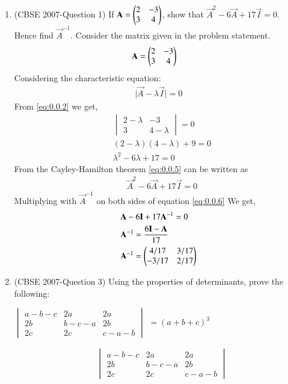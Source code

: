 \documentclass[journal,12pt,twocolumn]{IEEEtran}
\begin{document}
\begin{enumerate}

\item (CBSE 2007-Question 1)
If $\mathbf{A} = \begin{pmatrix}2&-3\\3&4\end{pmatrix}$, show that $ \vec{A}^2-6\vec{A}+17\vec{I}=0$. Hence find $\vec{A}^{-1}$. 
\solution Consider the matrix  given in the problem statement.
\begin{align}
&\mathbf{A} = \begin{pmatrix}2&-3\\3&4\end{pmatrix}&
\end{align}
Considering the characteristic equation:  
\begin{align} 
& \vert\vec{A}-\lambda\vec{I}\vert = 0  & \label{eq:0.0.2}
\end{align}
From \eqref{eq:0.0.2} we get,
\begin{align}
&\begin{vmatrix}
  2-\lambda & -3\\ 3& 4-\lambda 
\end{vmatrix}
=0 \\
&(2-\lambda)(4-\lambda)+9=0\\ 
&\lambda^2-6\lambda+17=0 \label{eq:0.0.5} 
\end{align}
From the Cayley-Hamilton theorem \eqref{eq:0.0.5} can be written as
\begin{align}
&\vec{A}^2-6\vec{A}+17\vec{I} = 0  \label{eq:0.0.6} 
\end{align} 
Multiplying with $\vec{A}^{-1}$ on both sides of equation \eqref{eq:0.0.6}
We get,
\begin{align}
  &\mathbf{A}-6\mathbf{I}+17\mathbf{A}^{-1} = 0  \\
  &\mathbf{A}^{-1} = \displaystyle\frac{6\mathbf{I}-\mathbf{A}}{17} \\
  &\mathbf{A}^{-1} =  \begin{pmatrix}4/17 &  3/17 \\ -3/17 & 2/17 \end{pmatrix}
\end{align}
\item (CBSE 2007-Question 3) Using the properties of determinants, prove the following:
\begin{center}
$\begin{vmatrix}
a-b-c & 2a& 2a\\ 2b& b-c-a& 2b\\2c&2c&c-a-b 
\end{vmatrix}$
$= (a+b+c)^3$
\end{center}
\solution
 \begin{align}
  &\begin{vmatrix}
    a-b-c & 2a& 2a\\ 2b& b-c-a& 2b\\2c&2c&c-a-b 

\end{vmatrix}
\end{align}
\end{enumerate}
\end{document}
